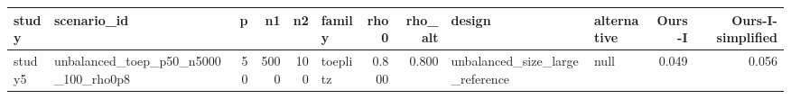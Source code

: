 \begin{tabular}{llrrrlrrllrr}
\toprule
study & scenario\_id & p & n1 & n2 & family & rho0 & rho\_alt & design & alternative & Ours-I & Ours-I-simplified \\
\midrule
study5 & unbalanced\_toep\_p50\_n5000\_100\_rho0p8 & 50 & 5000 & 100 & toeplitz & 0.800 & 0.800 & unbalanced\_size\_large\_reference & null & 0.049 & 0.056 \\
\bottomrule
\end{tabular}
